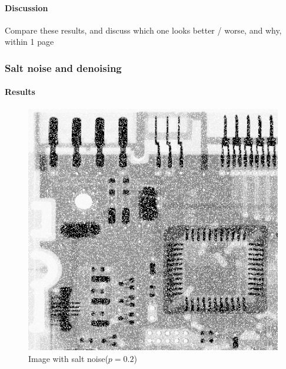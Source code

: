 \documentclass{article}
\begin{document}
\paragraph{Discussion}
Compare these results, and discuss which one looks better / worse, and why, within 1 page

\subsubsection[H]{Salt noise and denoising}

\paragraph{Results}

\begin{figure}[H]
	\centering
	\includegraphics[width=336pt]{../result/task2/salt/salt-20.png}
	\caption{Image with salt noise($p=0.2$)}
	\label{fig:salt}
\end{figure}
\end{document}
